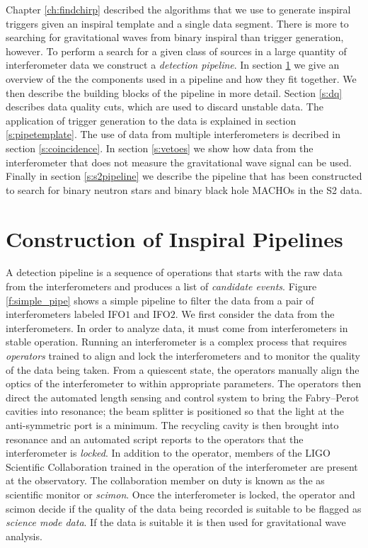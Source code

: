 
Chapter \ref{ch:findchirp} described the algorithms that we use to generate
inspiral triggers given an inspiral template and a single data segment.
There is more to searching for gravitational waves from binary inspiral than
trigger generation, however. To perform a search for a given class of sources in a
large quantity of interferometer data we construct a \emph{detection
pipeline}.  In section \ref{s:construction} we give an overview of the
the components used in a pipeline and how they fit together.
We then describe the building blocks of the pipeline in more detail. Section
\ref{s:dq} describes data quality cuts, which are used to discard unstable
data. The application of trigger generation to the data is explained in
section \ref{s:pipetemplate}. The use of data from multiple interferometers is
decribed in section \ref{s:coincidence}. In section \ref{s:vetoes} we
show how data from the interferometer that does not measure the gravitational
wave signal can be used.  Finally in section \ref{s:s2pipeline} we describe
the pipeline that has been constructed to search for binary neutron stars and
binary black hole MACHOs in the S2 data.

\section{Construction of Inspiral Pipelines}
\label{s:construction}

A detection pipeline is a sequence of operations that starts with the raw data
from the interferometers and produces a list of \emph{candidate events}.
Figure \ref{f:simple_pipe} shows a simple pipeline to filter the data from a
pair of interferometers labeled IFO$1$ and IFO$2$.
We first consider the data from the interferometers. In order to analyze
data, it must come from interferometers in stable operation. Running an
interferometer is a complex process that requires \emph{operators} trained to
align and lock the interferometers and to monitor the quality of the data
being taken. From a quiescent state, the operators manually align the optics
of the interferometer to within appropriate parameters. The operators then
direct the automated length sensing and control system to bring the
Fabry--Perot cavities into resonance; the beam splitter is positioned so that
the light at the anti-symmetric port is a minimum. The recycling cavity is
then brought into resonance and an automated script reports to the operators
that the interferometer is \emph{locked}. In addition to the operator, 
members of the LIGO Scientific Collaboration trained in the operation
of the interferometer are present at the observatory. The collaboration member
on duty is known as the as scientific monitor or \emph{scimon}. Once the
interferometer is locked, the operator and scimon decide if the quality of the
data being recorded is suitable to be flagged as \emph{science mode data}. If 
the data is suitable it is then used for gravitational wave analysis.

